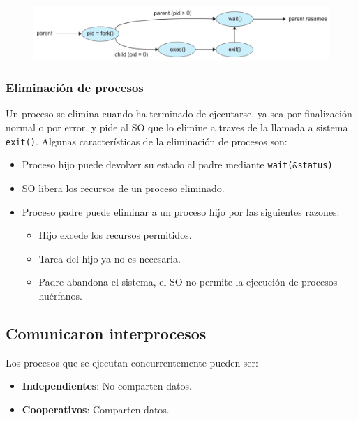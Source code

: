 \documentclass{templateNote}
\begin{document}
\begin{figure}[H]
    \centering
    \includegraphics[width=\textwidth]{img/creacion.png}
\end{figure}


\subsubsection*{Eliminación de procesos}

Un proceso se elimina cuando ha terminado de ejecutarse, ya sea por finalización normal o por error, y pide al SO que lo elimine a traves de la llamada a sistema \texttt{exit()}. Algunas características de la eliminación de procesos son:
\begin{itemize}
    \item Proceso hijo puede devolver su estado al padre mediante \texttt{wait(\&status)}.
    \item SO libera los recursos de un proceso eliminado.
    \item Proceso padre puede eliminar a un proceso hijo por las siguientes razones:
    \begin{itemize}
        \item Hijo excede los recursos permitidos.
        \item Tarea del hijo ya no es necesaria.
        \item Padre abandona el sistema, el SO no permite la ejecución de procesos huérfanos.
    \end{itemize}
\end{itemize}

\subsection*{Comunicaron interprocesos}
Los procesos que se ejecutan concurrentemente pueden ser:
\begin{itemize}
    \item \textbf{Independientes}: No comparten datos.
    \item \textbf{Cooperativos}: Comparten datos.
\end{itemize}
\end{document}
